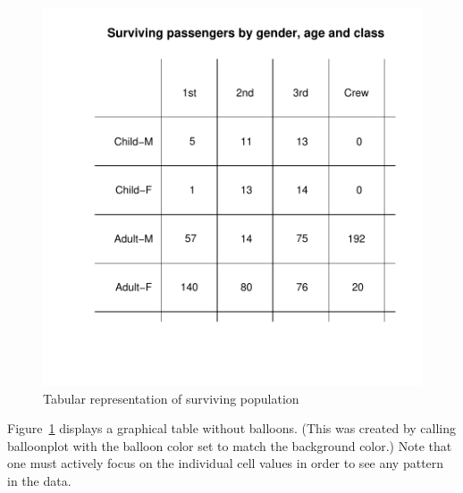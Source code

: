 \documentclass[a4paper]{report}
\begin{document}
\begin{article}
\begin{figure}[h]
\includegraphics[width=\textwidth]{SurvivedPopWhite.pdf}
\vspace{-0.65in}
\caption{\label{figure:Surv.Pop.White}
Tabular representation of surviving population}
\end{figure}

Figure~\ref{figure:Surv.Pop.White} displays a graphical table
without balloons.  (This was created by calling balloonplot with the
balloon color set to match the background color.)  Note that one
must actively focus on the individual cell values in order to see
any pattern in the data.


\end{article}
\end{document}

